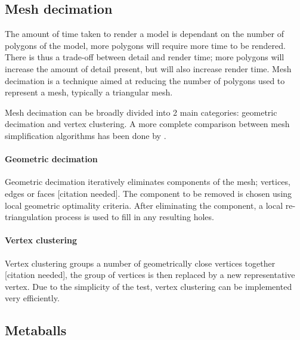 
\subsection{Mesh decimation}
\label{sub:meshdecimation}

The amount of time taken to render a model is dependant on the number of
polygons of the model, more polygons will require more time to be rendered.
There is thus a trade-off between detail and render time; more polygons will
increase the amount of detail present, but will also increase render time.
Mesh decimation is a technique aimed at reducing the number of polygons used to
represent a mesh, typically a triangular mesh.

Mesh decimation can be broadly divided into 2 main categories: geometric
decimation and vertex clustering. A more complete comparison between mesh
simplification algorithms has been done by \citet{cignoni98}.

\paragraph{Geometric decimation}

Geometric decimation iteratively eliminates components of the mesh; vertices,
edges or faces [citation needed]. The component to be removed is chosen using
local geometric optimality criteria. After eliminating the component, a local
re-triangulation process is used to fill in any resulting holes.


\paragraph{Vertex clustering}


Vertex clustering groups a number of geometrically close vertices together
[citation needed], the group of vertices is then replaced by a new
representative vertex.  Due to the simplicity of the test, vertex clustering
can be implemented very efficiently.



\subsection{Metaballs}
\label{sub:metaballs}

